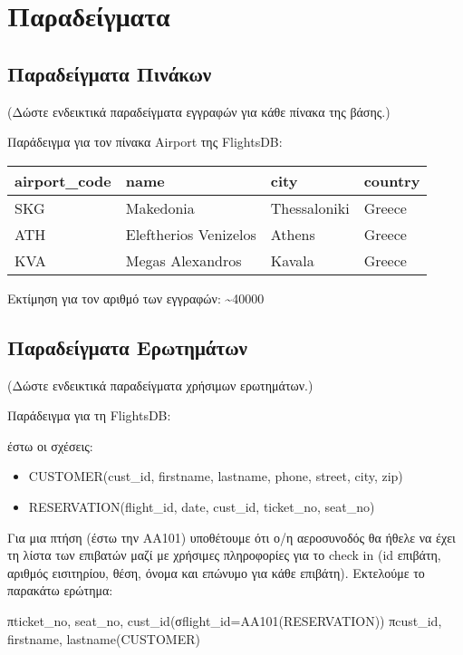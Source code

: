 \section{Παραδείγματα}

\subsection{Παραδείγματα Πινάκων}

(Δώστε ενδεικτικά παραδείγματα εγγραφών για κάθε πίνακα της βάσης.)

Παράδειγμα για τον πίνακα Airport της FlightsDB:

\begin{tabular}{|p{3cm}|p{4cm}|p{3cm}|p{3cm}|}
  \hline
  airport\_code & name & city & country \\ \hline
  SKG & Makedonia & Thessaloniki & Greece \\ \hline
  ATH & Eleftherios Venizelos & Athens & Greece \\ \hline
  KVA & Megas Alexandros & Kavala & Greece \\ \hline
\end{tabular}
  
Εκτίμηση για τον αριθμό των εγγραφών: \textasciitilde 40000

\subsection{Παραδείγματα Ερωτημάτων}

(Δώστε ενδεικτικά παραδείγματα χρήσιμων ερωτημάτων.)

Παράδειγμα για τη FlightsDB:

έστω οι σχέσεις:

\begin{itemize}[noitemsep]
\item CUSTOMER(cust\_id, firstname, lastname, phone, street, city,
  zip)
\item RESERVATION(flight\_id, date, cust\_id, ticket\_no, seat\_no)
\end{itemize}

Για μια πτήση (έστω την AA101) υποθέτουμε ότι ο/η αεροσυνοδός θα ήθελε
να έχει τη λίστα των επιβατών μαζί με χρήσιμες πληροφορίες για το
check in (id επιβάτη, αριθμός εισιτηρίου, θέση, όνομα και επώνυμο για
κάθε επιβάτη). Εκτελούμε το παρακάτω ερώτημα:

πticket\_no, seat\_no, cust\_id(σflight\_id=AA101(RESERVATION))
πcust\_id, firstname, lastname(CUSTOMER)


